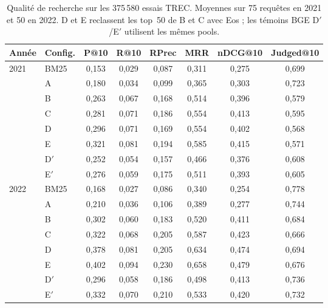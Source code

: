 \documentclass{article}
\begin{document}
\begin{table}[t]
  \caption{Qualité de recherche sur les 375\,580 essais TREC. Moyennes sur 75 requêtes en 2021 et 50 en 2022. D et E reclassent les top~50 de B et C avec Eos ; les témoins BGE D$\prime$/E$\prime$ utilisent les mêmes pools.}
  \label{tab:results-exp1}
  \centering
  \small
  \begin{tabular}{llcccccc}
    \toprule
    Année & Config. & P@10 & R@10 & RPrec & MRR & nDCG@10 & Judged@10 \\
    \midrule
    2021 & BM25 & 0{,}153 & 0{,}029 & 0{,}087 & 0{,}311 & 0{,}275 & 0{,}699 \\
     & A & 0{,}180 & 0{,}034 & 0{,}099 & 0{,}365 & 0{,}303 & 0{,}723 \\
     & B & 0{,}263 & 0{,}067 & 0{,}168 & 0{,}514 & 0{,}396 & 0{,}579 \\
     & C & 0{,}281 & 0{,}071 & 0{,}186 & 0{,}554 & 0{,}413 & 0{,}595 \\
     & D & 0{,}296 & 0{,}071 & 0{,}169 & 0{,}554 & 0{,}402 & 0{,}568 \\
     & E & 0{,}321 & 0{,}081 & 0{,}194 & 0{,}585 & 0{,}415 & 0{,}571 \\
     & D$'$ & 0{,}252 & 0{,}054 & 0{,}157 & 0{,}466 & 0{,}376 & 0{,}608 \\
     & E$'$ & 0{,}276 & 0{,}059 & 0{,}175 & 0{,}511 & 0{,}393 & 0{,}605 \\
    \midrule
    2022 & BM25 & 0{,}168 & 0{,}027 & 0{,}086 & 0{,}340 & 0{,}254 & 0{,}778 \\
     & A & 0{,}210 & 0{,}036 & 0{,}106 & 0{,}389 & 0{,}277 & 0{,}744 \\
     & B & 0{,}302 & 0{,}060 & 0{,}183 & 0{,}520 & 0{,}411 & 0{,}684 \\
     & C & 0{,}322 & 0{,}068 & 0{,}205 & 0{,}587 & 0{,}423 & 0{,}666 \\
     & D & 0{,}378 & 0{,}081 & 0{,}205 & 0{,}634 & 0{,}474 & 0{,}694 \\
     & E & 0{,}402 & 0{,}094 & 0{,}230 & 0{,}658 & 0{,}479 & 0{,}676 \\
     & D$'$ & 0{,}296 & 0{,}058 & 0{,}186 & 0{,}498 & 0{,}413 & 0{,}736 \\
     & E$'$ & 0{,}332 & 0{,}070 & 0{,}210 & 0{,}533 & 0{,}420 & 0{,}732 \\
    \bottomrule
  \end{tabular}
\end{table}
\end{document}
